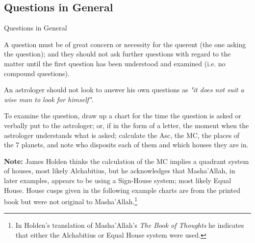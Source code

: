 \subsection{Questions in General}
\begin{frame}[t]{Questions in General}

A question must be of great concern or necessity for the querent (the one asking the question); and they should not ask further questions with regard to the matter until the first question has been understood and examined (i.e. no compound questions).

An astrologer should not look to answer his own questions as \textsl{"it does not suit a wise man to look for himself"}. 

To examine the question, draw up a chart for the time the question is asked or verbally put to the astrologer; or, if in the form of a letter, the moment when the astrologer understands what is asked; calculate the Asc, the MC, the places of the 7 planets, and note who disposits each of them and which houses they are in.
\vspace{0.5cm}
\begin{mdframed}[backgroundcolor=gray!5, rightmargin=2em, leftmargin=2em]
\small
\textbf{Note:} James Holden thinks the calculation of the MC implies a quadrant system of houses, most likely Alchabitius, but he acknowledges that Masha'Allah, in later examples, appears to be using a Sign-House system; most likely Equal House. House cusps given in the following example charts are from the printed book but were not original to Masha'Allah.\footnote{In Holden's translation of Masha'Allah's \textsl{The Book of Thoughts} he indicates that either the Alchabitius or Equal House system were used.}
\end{mdframed}

\end{frame}